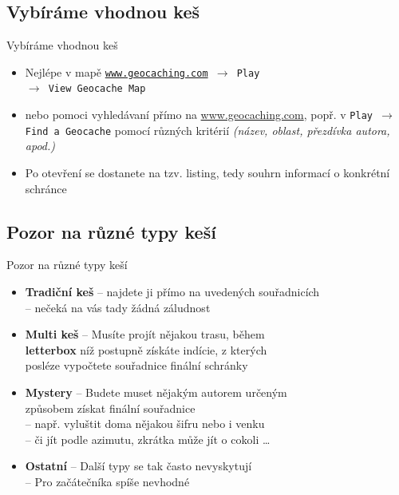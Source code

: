 \documentclass{beamer}
\begin{document}
	\subsection{Vybíráme vhodnou keš}
	\begin{frame}{Vybíráme vhodnou keš}
		\begin{itemize}
			\item Nejlépe v mapě \texttt{\url{www.geocaching.com} $\rightarrow$ Play \\$\rightarrow$ View Geocache Map}
			\item nebo pomoci vyhledávaní přímo na \url{www.geocaching.com}, popř. v \texttt{Play $\rightarrow$ Find a Geocache} pomocí různých kritérií \emph{(název, oblast, přezdívka autora, apod.)}
			\item Po otevření se dostanete na tzv. listing, tedy souhrn informací o konkrétní schránce
		\end{itemize}	
	\end{frame}
	
	\subsection{Pozor na různé typy keší}
	\begin{frame}{Pozor na různé typy keší}
		\begin{itemize}
			\item \textbf{Tradiční keš} -- najdete ji přímo na uvedených souřadnicích \\
			            \hspace{5.72em} -- nečeká na vás tady žádná záludnost
			\item \textbf{Multi keš}            -- Musíte projít nějakou trasu, během\\
			      \textbf{letterbox}\hspace{0.95em} níž postupně získáte indície,  z kterých \\
			                        \hspace{5.15em} posléze vypočtete souřadnice finální schránky
			\item \textbf{Mystery} -- Budete muset nějakým autorem určeným \\
			           \hspace{4.7em} způsobem získat finální souřadnice \\
			        \hspace{3.8em} -- např. vyluštit doma nějakou šifru nebo i venku \\
			        \hspace{3.8em} -- či jít podle azimutu, zkrátka může jít o cokoli \dots
			\item \textbf{Ostatní} -- Další typy se tak často nevyskytují \\
			       \hspace{3.45em} -- Pro začátečníka spíše nevhodné
		\end{itemize}
	\end{frame}
	
\end{document}
